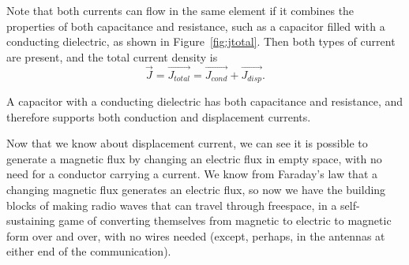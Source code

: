 \documentclass{tufte-handout}
\begin{document}
Note that both currents can flow in the same element if it combines the properties of both capacitance and resistance, such as a capacitor filled with a conducting dielectric, as shown in Figure~\ref{fig:jtotal}. Then both types of current are present, and the total current density is 
\begin{equation}
\vec{J} = \vec{J_{total}} = \vec{J_{cond}} + \vec{J_{disp}}.
\end{equation}

\begin{marginfigure}

\caption{A capacitor with a conducting dielectric has both capacitance and resistance, and therefore supports both conduction and displacement currents.}
\label{fig:jtotal}
\end{marginfigure} 


Now that we know about displacement current, we can see it is possible to generate a magnetic flux by changing an electric flux in empty space, with no need for a conductor carrying a current. We know from Faraday's law that a changing magnetic flux generates an electric flux, so now we have the building blocks of making radio waves that can travel through freespace, in a self-sustaining game of converting themselves from magnetic to electric to magnetic form over and over, with no wires needed (except, perhaps, in the antennas at either end of the communication).
\end{document}
